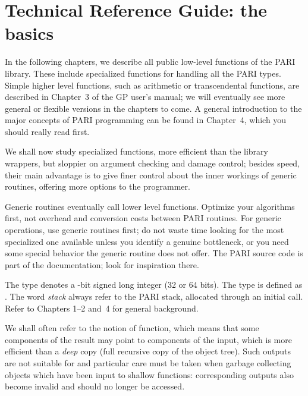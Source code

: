 %
%
\chapter{Technical Reference Guide: the basics}

In the following chapters, we describe all public low-level functions of the
PARI library. These include specialized functions for handling all the PARI
types. Simple higher level functions, such as arithmetic or transcendental
functions, are described in Chapter~3 of the GP user's manual; we will
eventually see more general or flexible versions in the chapters to come. A
general introduction to the major concepts of PARI programming can be found
in Chapter~4, which you should really read first.

We shall now study specialized functions, more efficient than the library
wrappers, but sloppier on argument checking and damage control; besides
speed, their main advantage is to give finer control about the inner
workings of generic routines, offering more options to the programmer.

 Generic routines eventually call lower level
functions. Optimize your algorithms first, not overhead and conversion costs
between PARI routines. For generic operations, use generic routines first;
do not waste time looking for the most specialized one available unless you
identify a genuine bottleneck, or you need some special behavior the generic
routine does not offer. The PARI source code is part of the documentation;
look for inspiration there.\smallskip

The type  denotes a -bit signed long integer (32
or 64 bits). The type  is defined as . The word
\emph{stack} always refer to the PARI stack, allocated through an initial
 call. Refer to Chapters 1--2 and~4 for general background.

We shall often refer to the notion of  function, which means that
some components of the result may point to components of the input, which is
more efficient than a \emph{deep} copy (full recursive copy of the object
tree). Such outputs are not suitable for  and particular
care must be taken when garbage collecting objects which have been input to
shallow functions: corresponding outputs also become invalid and should no
longer be accessed.

